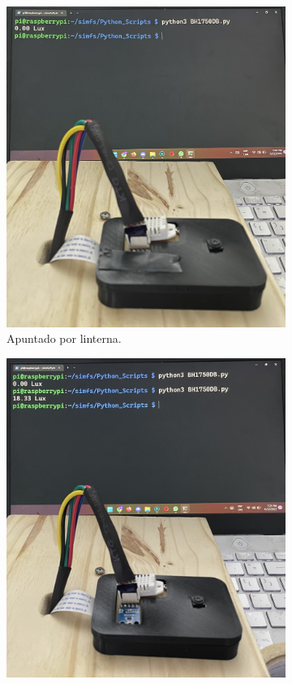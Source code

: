 \begin{figure}[H]
\centering
        \begin{subfigure}{0.33\textwidth}
        	\centering
        	\includegraphics[width=\linewidth]{ImagenesValidacion del prototipo/TINTFUN3a}
        	\caption{Apuntado por linterna.}
        \end{subfigure}
        \begin{subfigure}{0.33\textwidth}
        	\centering
        	\includegraphics[width=\linewidth]{ImagenesValidacion del prototipo/TINTFUN3b}

\end{subfigure}
\end{figure}
